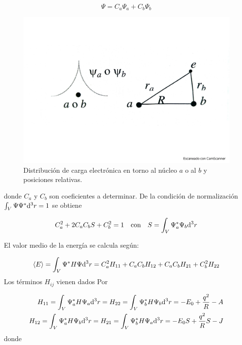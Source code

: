 \begin{equation}
    \Psi = C_a \Psi_a + C_b \Psi_b \label{Ec:03-04-01}
\end{equation}

\begin{figure}[h!] \centering
    \includegraphics[scale=0.4]{Cuerpo/Ch_03/Fotos libro 3.pdf}
    \caption{Distribución de carga electrónica en torno al núcleo $a$ o al $b$ y posiciones relativas.}
    \label{Fig:03-04}
\end{figure}    


donde $C_a$ y $C_b$ son coeficientes a determinar. De la condición de normalización $\int_V \Psi \Psi^* \mathrm{d}^3 r = 1$ se obtiene 

\begin{equation}
    C_a^2 + 2 C_a C_b S + C_b^2 = 1 \quad \text{con} \quad S = \int_V \Psi_a^* \Psi_b \mathrm{d}^3 r \label{Ec:03-04-02}
\end{equation}

El valor medio de la energía se calcula según:

\begin{equation}
    \langle E \rangle = \int_V \Psi^* H \Psi \mathrm{d}^3 r = C_a^2 H_{11} + C_a C_b H_{12} + C_a C_b H_{21} + C_b^2 H_{22} \label{Ec:03-04-03}
\end{equation}
Los términos $H_{ij}$ vienen dados Por

\begin{align*}
    H_{11} = \int_V \Psi_a^* H \Psi_a \mathrm{d}^3 r = H_{22} = \int_V \Psi_b^* H \Psi_b \mathrm{d}^3 r = - E_0 + \frac{q^2}{R}-A \\
    H_{12} = \int_V \Psi_a^* H \Psi_b \mathrm{d}^3 r = H_{21} = \int_V \Psi_b^* H \Psi_a \mathrm{d}^3 r = - E_0 S + \frac{q^2}{R}S-J \\
\end{align*}
donde 


